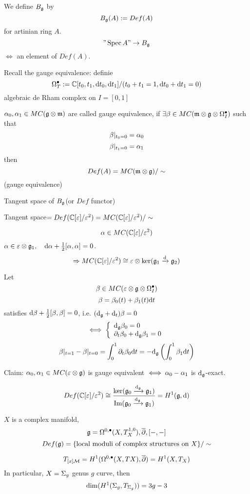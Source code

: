 \begin{definition}
We define $B_{\mathfrak{g}}$ by 
$$B_{\mathfrak{g}}(A):=Def(A)$$
for artinian ring $A$.
$$"\operatorname{Spec} A"\to B_{\mathfrak{g}}$$
$\iff$ an element of $Def(A)$.
\end{definition}

Recall the gauge equivalence: definie
$$\Omega_T^{\bullet}:=\mathbb{C}[t_0,t_1,\mathrm{d} t_0,\mathrm{d} t_1]/(t_0+t_1=1,\mathrm{d} t_0+\mathrm{d} t_1=0)$$
algebraic de Rham complex on $I=[0,1]$

\begin{definition}
$\alpha_0,\alpha_1\in MC(\mathfrak{g}\otimes\mathfrak{m})$ are called gauge equivalence, if 
$\exists\beta\in MC(\mathfrak{m}\otimes\mathfrak{g}\otimes\Omega_I^{\bullet})$ such that
$$\beta|_{t_0=0}=\alpha_0$$
$$\beta|_{t_1=0}=\alpha_1$$
then 
$$Def(A)=MC(\mathfrak{m}\otimes\mathfrak{g})/\sim$$
(gauge equivalence)
\end{definition}

Tangent space of $B_{\mathfrak{g}}$(or $Def$ functor)

Tangent space$=Def(\mathbb{C}[\varepsilon]/\varepsilon^2)=MC(\mathbb{C}[\varepsilon]/\varepsilon^2)/\sim$

$$\alpha\in MC(\mathbb{C}[\varepsilon]/\varepsilon^2)$$
$\alpha\in\varepsilon\otimes\mathfrak{g}_1,\quad\mathrm{d}\alpha+\frac{1}{2}[\alpha,\alpha]=0$.
$$\Rightarrow MC(\mathbb{C}[\varepsilon]/\varepsilon^2)\cong\varepsilon\otimes\ker(\mathfrak{g}_1\xrightarrow{\mathrm{d}}\mathfrak{g}_2)$$

Let
$$\beta\in MC(\varepsilon\otimes\mathfrak{g}\otimes\Omega_I^{\bullet})$$
$$\beta=\beta_0(t)+\beta_1(t)\mathrm{d} t$$
satisfies $\mathrm{d}\beta+\frac{1}{2}[\beta,\beta]=0$, i.e. $(\mathrm{d}_{\mathfrak{g}}+\mathrm{d}_t)\beta=0$
$$
  \iff 
  \left\{
    \begin{array}{l}
      \mathrm{d}_{\mathfrak{g}}\beta_0=0\\
      \partial_t\beta_0+\mathrm{d}_{\mathfrak{g}}\beta_1=0
    \end{array}
  \right.
$$
$$\beta|_{t=1}-\beta|_{t=0}=\int_{0}^{1}\partial_t\beta_0\mathrm{d} t
=-\mathrm{d}_{\mathfrak{g}}\left(\int_{0}^{1}\beta_1\mathrm{d} t\right)$$

Claim: $\alpha_0,\alpha_1\in MC(\varepsilon\otimes\mathfrak{g})$ is gauge equivalent 
$\iff\alpha_0-\alpha_1$ is $\mathrm{d}_{\mathfrak{g}}$-exact.

\begin{cor}
$$Def(\mathbb{C}[\varepsilon]/\varepsilon^2)
\cong\frac{\ker(\mathfrak{g}_0\xrightarrow{\mathrm{d}_{\mathfrak{g}}}\mathfrak{g}_1)}
{\operatorname{Im}(\mathfrak{g}_0\xrightarrow{\mathrm{d}_{\mathfrak{g}}}\mathfrak{g}_1)}=H^1(\mathfrak{g},\mathrm{d})$$
\end{cor}

\begin{example}$X$ is a complex manifold, 
$$\mathfrak{g}=\Omega^{0,\bullet}(X,T^{1,0}_X),\overline{\partial},[-,-]$$
$$Def(\mathfrak{g})=\{\text{local moduli of complex structures on $X$}\}/\sim$$

$$T_{[x]\mathcal{M}}=H^1(\Omega^{0,\bullet}(X,TX),\overline{\partial})=H^1(X,T_X)$$
In particular, $X=\Sigma_g$ genus $g$ curve, then 
$$\dim(H^1(\Sigma_g,T_{\Sigma_g}))=3g-3$$
\end{example}



